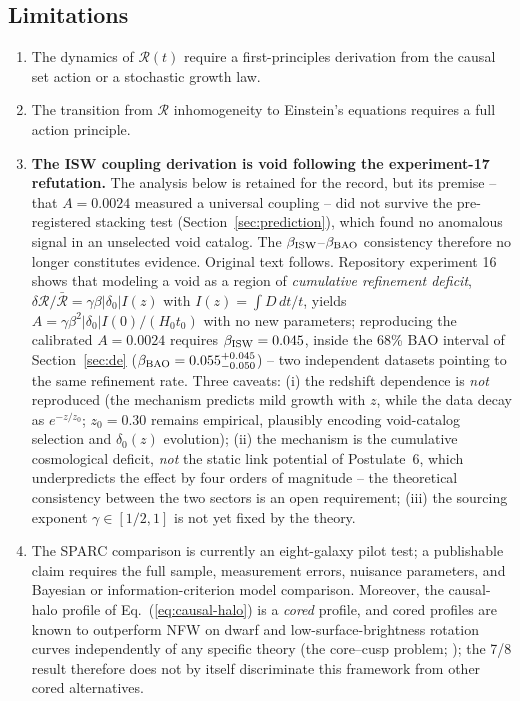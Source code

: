 \documentclass[12pt]{article}
\begin{document}
\subsection{Limitations}
\begin{enumerate}
\item The dynamics of $\mathcal{R}(t)$ require a first-principles derivation from the causal set action or a stochastic growth law.
\item The transition from $\mathcal{R}$ inhomogeneity to Einstein's equations requires a full action principle.
\item {\bf The ISW coupling derivation is void following the experiment-17 refutation.} The analysis below is retained for the record, but its premise -- that $A=0.0024$ measured a universal coupling -- did not survive the pre-registered stacking test (Section~\ref{sec:prediction}), which found no anomalous signal in an unselected void catalog. The $\beta_{\rm ISW}$--$\beta_{\rm BAO}$ consistency therefore no longer constitutes evidence. Original text follows. Repository experiment 16 shows that modeling a void as a region of \emph{cumulative refinement deficit}, $\delta\mathcal{R}/\bar{\mathcal{R}} = \gamma\beta|\delta_0| I(z)$ with $I(z)=\int D\,dt/t$, yields $A = \gamma\beta^2|\delta_0| I(0)/(H_0t_0)$ with no new parameters; reproducing the calibrated $A=0.0024$ requires $\beta_{\rm ISW}=0.045$, inside the 68\% BAO interval of Section~\ref{sec:de} ($\beta_{\rm BAO}=0.055^{+0.045}_{-0.050}$) -- two independent datasets pointing to the same refinement rate. Three caveats: (i) the redshift dependence is \emph{not} reproduced (the mechanism predicts mild growth with $z$, while the data decay as $e^{-z/z_0}$; $z_0=0.30$ remains empirical, plausibly encoding void-catalog selection and $\delta_0(z)$ evolution); (ii) the mechanism is the cumulative cosmological deficit, \emph{not} the static link potential of Postulate~6, which underpredicts the effect by four orders of magnitude -- the theoretical consistency between the two sectors is an open requirement; (iii) the sourcing exponent $\gamma\in[1/2,1]$ is not yet fixed by the theory.
\item The SPARC comparison is currently an eight-galaxy pilot test; a publishable claim requires the full sample, measurement errors, nuisance parameters, and Bayesian or information-criterion model comparison. Moreover, the causal-halo profile of Eq.~(\ref{eq:causal-halo}) is a \emph{cored} profile, and cored profiles are known to outperform NFW on dwarf and low-surface-brightness rotation curves independently of any specific theory (the core--cusp problem; \citealp{deblok2010}); the 7/8 result therefore does not by itself discriminate this framework from other cored alternatives.

\end{enumerate}
\end{document}
